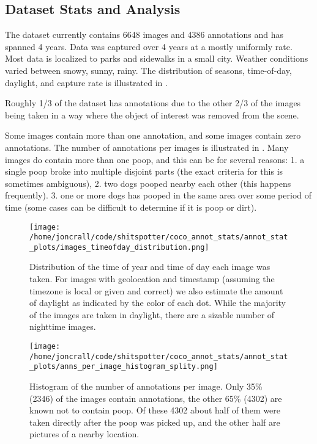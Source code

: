 \documentclass[10pt,twocolumn,letterpaper]{article}
\begin{document}
\subsection{Dataset Stats and Analysis}


The dataset currently contains 6648 images and 4386 annotations and has spanned
4 years. Data was captured over 4 years at a mostly uniformly rate.  Most data
is localized to parks and sidewalks in a small city.  Weather conditions varied
between snowy, sunny, rainy.  The distribution of seasons, time-of-day,
daylight, and capture rate is illustrated in .

Roughly 1/3 of the dataset has annotations due to the other 2/3 of the
images being taken in a way where the object of interest was removed from the
scene.

Some images contain more than one annotation, and some images contain zero annotations.
The number of annotations per images is illustrated in .
Many images do contain more than one poop, and this can be for several reasons:
    1. a single poop broke into multiple disjoint parts (the exact criteria for this is sometimes ambiguous), 
    2. two dogs pooped nearby each other (this happens frequently). 
    3. one or more dogs has pooped in the same area over some period of
       time (some cases can be difficult to determine if it is poop or dirt).


\begin{figure}[h]
\centering
\texttt{[image: /home/joncrall/code/shitspotter/coco\_annot\_stats/annot\_stat\_plots/images\_timeofday\_distribution.png]}
\caption[]{
    Distribution of the time of year and time of day each image was taken.
    For images with geolocation and timestamp (assuming the timezone is local
    or given and correct) we also estimate the amount of daylight as indicated
    by the color of each dot. While the majority of the images are taken in
    daylight, there are a sizable number of nighttime images.
}
\label{fig:TimeOfDayDistribution}
\end{figure}


\begin{figure}[h]
\centering
\texttt{[image: /home/joncrall/code/shitspotter/coco\_annot\_stats/annot\_stat\_plots/anns\_per\_image\_histogram\_splity.png]}
\caption[]{
    Histogram of the number of annotations per image. 
    Only 35\% (2346) of the images contain annotations, the other 65\% (4302)
    are known not to contain poop. Of these 4302 about half of them were taken
    directly after the poop was picked up, and the other half are pictures of a
    nearby location.
}
\label{fig:AnnotsPerImage}
\end{figure}
\end{document}
